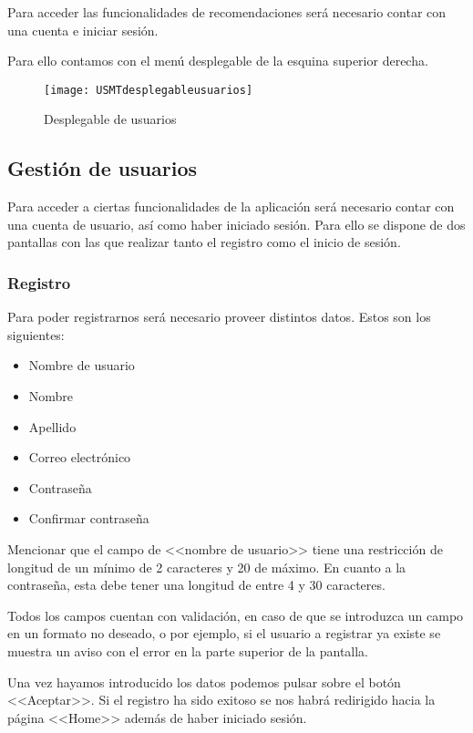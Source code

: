 Para acceder las funcionalidades de recomendaciones será necesario contar con una cuenta e iniciar sesión.

Para ello contamos con el menú desplegable de la esquina superior derecha.
\begin{figure}[h!]
	\centering
	\texttt{[image: USMTdesplegableusuarios]}\\
	\caption{Desplegable de usuarios}
\end{figure}


\subsection{Gestión de usuarios}

Para acceder a ciertas funcionalidades de la aplicación será necesario contar con una cuenta de usuario, así como haber iniciado sesión. Para ello se dispone de dos pantallas con las que realizar tanto el registro como el inicio de sesión.

\subsubsection{Registro}

Para poder registrarnos será necesario proveer distintos datos. Estos son los siguientes:

\begin{itemize}
	\item Nombre de usuario
	\item Nombre
	\item Apellido
	\item Correo electrónico
	\item Contraseña
	\item Confirmar contraseña
\end{itemize}

Mencionar que el campo de <<nombre de usuario>> tiene una restricción de longitud de un mínimo de 2 caracteres y 20 de máximo. En cuanto a la contraseña, esta debe tener una longitud de entre 4 y 30 caracteres.

Todos los campos cuentan con validación, en caso de que se introduzca un campo en un formato no deseado, o por ejemplo, si el usuario a registrar ya existe se muestra un aviso con el error en la parte superior de la pantalla.


Una vez hayamos introducido los datos podemos pulsar sobre el botón <<Aceptar>>. Si el registro ha sido exitoso se nos habrá redirigido hacia la página <<Home>> además de haber iniciado sesión.

